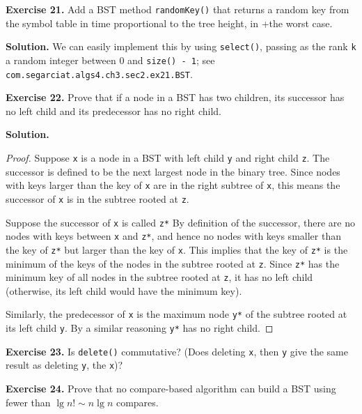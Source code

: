 \documentclass[12pt, a4paper]{article}
\newenvironment{ex}[2][Exercise]
{\par\medskip\noindent \textbf{#1 #2.}}
{\medskip}
\newenvironment{sol}[1][Solution]
{\par\medskip\noindent \textbf{#1.} }
{\medskip}
\begin{document}
	\begin{ex}{21}
		Add a BST method \texttt{randomKey()} that returns a random key from the symbol table
		in time proportional to the tree height, in +the worst case.
	\end{ex}
	\begin{sol}
		We can easily implement this by using \texttt{select()}, passing as
		the rank \texttt{k} a random integer between 0 and \texttt{size() - 1};
		see \texttt{com.segarciat.algs4.ch3.sec2.ex21.BST}.
	\end{sol}
	\begin{ex}{22}
		Prove that if a node in a BST has two children, its successor has no left child
		and its predecessor has no right child.
	\end{ex}
	\begin{sol}
		\begin{proof}
			Suppose \texttt{x} is a node in a BST with left child \texttt{y} and right child
			\texttt{z}. The successor is defined to be the next largest node in the binary
			tree. Since nodes with keys larger than the key of \texttt{x} are in the right
			subtree of \texttt{x}, this means the successor of \texttt{x} is in the subtree
			rooted at \texttt{z}.
			
			Suppose the successor of \texttt{x} is called \texttt{z*} By definition of the
			successor, there are no nodes with keys between \texttt{x} and \texttt{z*}, and
			hence no nodes with keys smaller than the key of \texttt{z*} but larger than the
			key of \texttt{x}. This implies that the key of \texttt{z*} is the minimum of the
			keys of the nodes in the subtree rooted at \texttt{z}. Since \texttt{z*} has the
			minimum key of all nodes in the subtree rooted at \texttt{z}, it has no left
			child (otherwise, its left child would have the minimum key).
			
			Similarly, the predecessor
			of \texttt{x} is the maximum node \texttt{y*} of the subtree rooted at its left child \texttt{y}. By a similar reasoning \texttt{y*} has no right child.
		\end{proof}
	\end{sol}
	\begin{ex}{23}
		Is \texttt{delete()} commutative? (Does deleting \texttt{x}, then \texttt{y} give
		the same result as deleting \texttt{y}, the \texttt{x})?
	\end{ex}
	\begin{ex}{24}
		Prove that no compare-based algorithm can build a BST using fewer than $\lg n!\sim n\lg n$
		compares.
	\end{ex}
	\pagebreak
	\printbibliography
\end{document}
